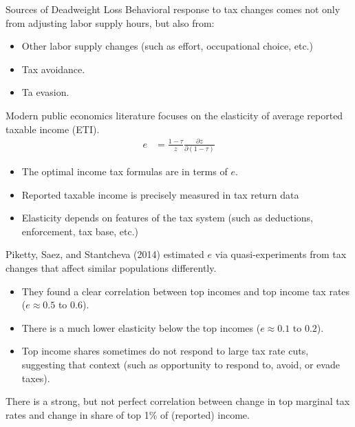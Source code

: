 \documentclass[10pt]{extarticle}
\begin{document}
  \begin{problem}{Sources of Deadweight Loss}
    Behavioral response to tax changes comes not only from adjusting labor supply hours, but also from:
    \begin{itemize}
      \item Other labor supply changes (such as effort, occupational choice, etc.)
      \item Tax avoidance.
      \item Ta evasion.
    \end{itemize}
    Modern public economics literature focuses on the elasticity of average reported taxable income (ETI).
    \begin{align*}
      e &= \frac{1-\tau}{z}\frac{\partial z}{\partial(1-\tau)}
    \end{align*}
    \begin{itemize}
      \item The optimal income tax formulas are in terms of $e$.
      \item Reported taxable income is precisely measured in tax return data
      \item Elasticity depends on features of the tax system (such as deductions, enforcement, tax base, etc.)
    \end{itemize}
    Piketty, Saez, and Stantcheva (2014) estimated $e$ via quasi-experiments from tax changes that affect similar populations differently.
    \begin{itemize}
      \item They found a clear correlation between top incomes and top income tax rates ($e\approx 0.5$ to $0.6$).
      \item There is a much lower elasticity below the top incomes ($e\approx 0.1$ to $0.2$).
      \item Top income shares sometimes do not respond to large tax rate cuts, suggesting that context (such as opportunity to respond to, avoid, or evade taxes).
    \end{itemize}
    There is a strong, but not perfect correlation between change in top marginal tax rates and change in share of top 1\% of (reported) income.
  \end{problem}
\end{document}
